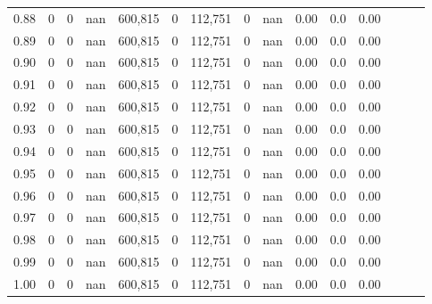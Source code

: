 \begin{tabular}{rrrrrrrrrrrrrrr}
0.88 &        0 &        0 &   nan &  600,815 &        0 &  112,751 &        0 &   nan &  0.00 &                   0.0 &      0.00 \\
0.89 &        0 &        0 &   nan &  600,815 &        0 &  112,751 &        0 &   nan &  0.00 &                   0.0 &      0.00 \\
0.90 &        0 &        0 &   nan &  600,815 &        0 &  112,751 &        0 &   nan &  0.00 &                   0.0 &      0.00 \\
0.91 &        0 &        0 &   nan &  600,815 &        0 &  112,751 &        0 &   nan &  0.00 &                   0.0 &      0.00 \\
0.92 &        0 &        0 &   nan &  600,815 &        0 &  112,751 &        0 &   nan &  0.00 &                   0.0 &      0.00 \\
0.93 &        0 &        0 &   nan &  600,815 &        0 &  112,751 &        0 &   nan &  0.00 &                   0.0 &      0.00 \\
0.94 &        0 &        0 &   nan &  600,815 &        0 &  112,751 &        0 &   nan &  0.00 &                   0.0 &      0.00 \\
0.95 &        0 &        0 &   nan &  600,815 &        0 &  112,751 &        0 &   nan &  0.00 &                   0.0 &      0.00 \\
0.96 &        0 &        0 &   nan &  600,815 &        0 &  112,751 &        0 &   nan &  0.00 &                   0.0 &      0.00 \\
0.97 &        0 &        0 &   nan &  600,815 &        0 &  112,751 &        0 &   nan &  0.00 &                   0.0 &      0.00 \\
0.98 &        0 &        0 &   nan &  600,815 &        0 &  112,751 &        0 &   nan &  0.00 &                   0.0 &      0.00 \\
0.99 &        0 &        0 &   nan &  600,815 &        0 &  112,751 &        0 &   nan &  0.00 &                   0.0 &      0.00 \\
1.00 &        0 &        0 &   nan &  600,815 &        0 &  112,751 &        0 &   nan &  0.00 &                   0.0 &      0.00 \\
\bottomrule
\end{tabular}
